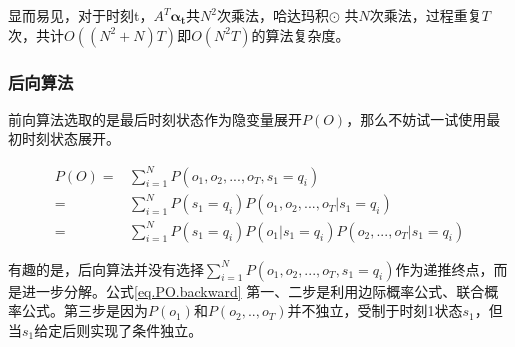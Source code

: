 \documentclass[]{article}
\begin{document}
   

   显而易见，对于时刻t，$A^{T}\mathbf{\alpha_{t}}$共$N^{2}$次乘法，哈达玛积$\odot $ 共$N$次乘法，过程重复$T$次，共计$O((N^{2}+N)T)$即$O(N^{2}T)$的算法复杂度。

\subsubsection{后向算法}

    前向算法选取的是最后时刻状态作为隐变量展开$P(O)$，那么不妨试一试使用最初时刻状态展开。

	\begin{equation}
	\begin{aligned}
		P(O)=&\sum_{i=1}^{N}P(o_{1},o_{2},...,o_{T},s_{1}=q_{i}) \\
		=&\sum_{i=1}^{N}P(s_{1}=q_{i})P(o_{1},o_{2},...,o_{T}|s_{1}=q_{i}) \\
		=&\sum_{i=1}^{N}P(s_{1}=q_{i})P(o_{1}|s_{1}=q_{i})P(o_{2},...,o_{T}|s_{1}=q_{i}) \label{eq.PO.backward}
	\end{aligned}
	\end{equation} 

    有趣的是，后向算法并没有选择$\sum_{i=1}^{N}P(o_{1},o_{2},...,o_{T},s_{1}=q_{i})$作为递推终点，而是进一步分解。公式\ref{eq.PO.backward}
    第一、二步是利用边际概率公式、联合概率公式。第三步是因为$P(o_{1})$和$P(o_{2},..,o_{T})$并不独立，受制于时刻1状态$s_1$，但当$s_{1}$给定后则实现了条件独立。
    
\end{document}
